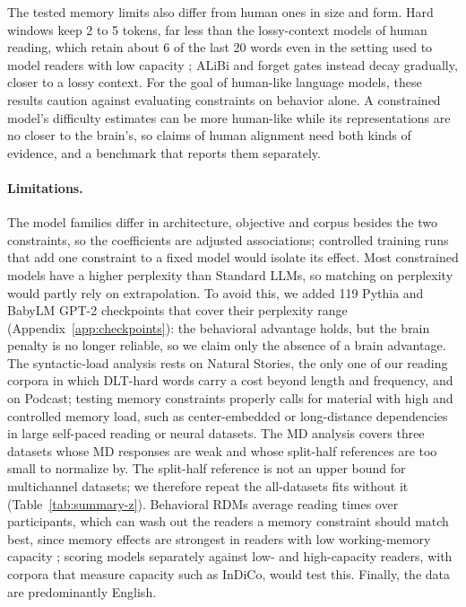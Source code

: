 The tested memory limits also differ from human ones in size and form. Hard windows keep 2 to 5 tokens, far less than the lossy-context models of human reading, which retain about 6 of the last 20 words even in the setting used to model readers with low capacity \citep{li2027modeling}; ALiBi and forget gates instead decay gradually, closer to a lossy context. For the goal of human-like language models, these results caution against evaluating constraints on behavior alone. A constrained model's difficulty estimates can be more human-like while its representations are no closer to the brain's, so claims of human alignment need both kinds of evidence, and a benchmark that reports them separately.

\paragraph{Limitations.} The model families differ in architecture, objective and corpus besides the two constraints, so the coefficients are adjusted associations; controlled training runs that add one constraint to a fixed model would isolate its effect. Most constrained models have a higher perplexity than Standard LLMs, so matching on perplexity would partly rely on extrapolation. To avoid this, we added 119 Pythia and BabyLM GPT-2 checkpoints that cover their perplexity range (Appendix~\ref{app:checkpoints}): the behavioral advantage holds, but the brain penalty is no longer reliable, so we claim only the absence of a brain advantage. The syntactic-load analysis rests on Natural Stories, the only one of our reading corpora in which DLT-hard words carry a cost beyond length and frequency, and on Podcast; testing memory constraints properly calls for material with high and controlled memory load, such as center-embedded or long-distance dependencies in large self-paced reading or neural datasets. The MD analysis covers three datasets whose MD responses are weak and whose split-half references are too small to normalize by. The split-half reference is not an upper bound for multichannel datasets; we therefore repeat the all-datasets fits without it (Table~\ref{tab:summary-z}). Behavioral RDMs average reading times over participants, which can wash out the readers a memory constraint should match best, since memory effects are strongest in readers with low working-memory capacity \citep{li2027modeling}; scoring models separately against low- and high-capacity readers, with corpora that measure capacity such as InDiCo, would test this. Finally, the data are predominantly English.
